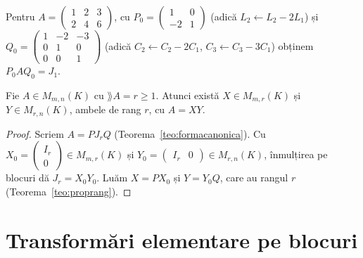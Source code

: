 \begin{exemplu}
Pentru $A=\begin{pmatrix}1&2&3\\2&4&6\end{pmatrix}$, cu $P_0=\begin{pmatrix}1&0\\-2&1\end{pmatrix}$ (adică $L_2\leftarrow L_2-2L_1$) și $Q_0=\begin{pmatrix}1&-2&-3\\0&1&0\\0&0&1\end{pmatrix}$ (adică $C_2\leftarrow C_2-2C_1$, $C_3\leftarrow C_3-3C_1$) obținem $P_0AQ_0=J_1$.
\end{exemplu}

\begin{lema}\label{lema:factorizare}
Fie $A\in M_{m,n}(K)$ cu $\rang A=r\ge1$. Atunci există $X\in M_{m,r}(K)$ și $Y\in M_{r,n}(K)$, ambele de rang $r$, cu $A=XY$.
\end{lema}

\begin{proof}
Scriem $A=PJ_rQ$ (Teorema~\ref{teo:formacanonica}). Cu $X_0=\begin{pmatrix}I_r\\0\end{pmatrix}\in M_{m,r}(K)$ și $Y_0=\begin{pmatrix}I_r&0\end{pmatrix}\in M_{r,n}(K)$, înmulțirea pe blocuri dă $J_r=X_0Y_0$. Luăm $X=PX_0$ și $Y=Y_0Q$, care au rangul $r$ (Teorema~\ref{teo:proprang}).
\end{proof}

\section{Transformări elementare pe blocuri}

